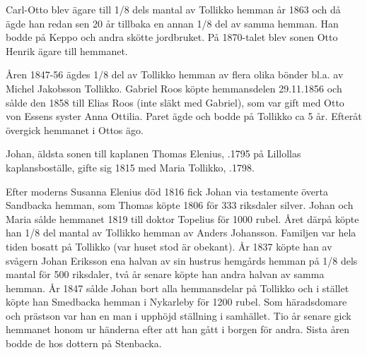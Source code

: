 Carl-Otto blev ägare till 1/8 dels mantal av Tollikko hemman år 1863 och då ägde han redan sen 20 år tillbaka en annan 1/8 del av samma hemman. Han bodde på Keppo och andra skötte jordbruket. På 1870-talet blev sonen Otto Henrik ägare till hemmanet.


Åren 1847-56 ägdes 1/8 del av Tollikko hemman av flera olika bönder bl.a. av Michel Jakobsson Tollikko. Gabriel Roos köpte hemmansdelen 29.11.1856 och sålde den 1858 till Elias Roos (inte släkt med Gabriel), som var gift med Otto von Essens syster Anna Ottilia. Paret ägde och bodde på Tollikko ca 5 år. Efteråt övergick hemmanet i Ottos ägo.


Johan, äldsta sonen till kaplanen Thomas Elenius, .1795 på Lillollas kaplansboställe, gifte sig 1815 med Maria Tollikko, .1798.
\begin{jhchildren}
  \item {}
  \item {}
  \item {}
  \item {}
  \item {}
  \item {}
  \item {}
  \item {}
\end{jhchildren}
Efter moderns Susanna Elenius död 1816 fick Johan via testamente överta Sandbacka hemman, som Thomas köpte 1806 för 333 riksdaler silver. Johan och Maria sålde hemmanet 1819 till doktor Topelius för 1000 rubel. Året därpå köpte han 1/8 del mantal av Tollikko hemman av Anders Johansson. Familjen var hela tiden bosatt på Tollikko (var huset stod är obekant). År 1837 köpte han av svågern Johan Eriksson ena halvan av sin hustrus hemgårds hemman på 1/8 dels mantal för 500 	riksdaler, två år senare köpte han andra halvan av samma hemman. År 1847 sålde Johan bort alla hemmansdelar på Tollikko och i stället köpte han Smedbacka hemman i Nykarleby för 1200 rubel. Som häradsdomare och prästson var han en man i upphöjd ställning i samhället. Tio år senare gick hemmanet honom ur händerna efter att han gått i borgen för andra. Sista åren bodde de hos dottern på Stenbacka.



